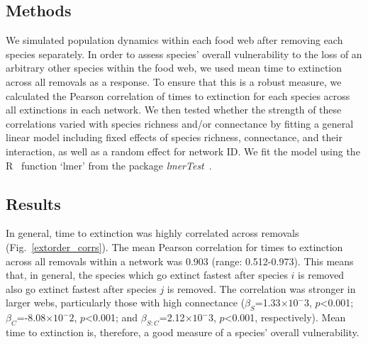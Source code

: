 \documentclass[12pt]{article}
\begin{document}
	\subsection*{Methods}

		We simulated population dynamics within each food web after removing each species separately. 
		In order to assess species' overall vulnerability to the loss of an arbitrary other species within the food web, we used mean time to extinction across all removals as a response. 
		To ensure that this is a robust measure, we calculated the Pearson correlation of times to extinction for each species across all extinctions in each network. 
		We then tested whether the strength of these correlations varied with species richness and/or connectance by fitting a general linear model including fixed effects of species richness, connectance, and their interaction, as well as a random effect for network ID. 
		We fit the model using the R~\citep{R} function `lmer' from the package \emph{lmerTest}~\citep{lmerTest}.


	\subsection*{Results}

		In general, time to extinction was highly correlated across removals (Fig.~\ref{extorder_corrs}). %
		The mean Pearson correlation for times to extinction across all removals within a network was 0.903 (range: 0.512-0.973). %
		This means that, in general, the species which go extinct fastest after species $i$ is removed also go extinct fastest after species $j$ is removed.
		The correlation was stronger in larger webs, particularly those with high connectance ($\beta_{S}$=1.33$\times10^-3$, $p$\textless0.001; $\beta_{C}$=-8.08$\times10^-2$, $p$\textless0.001; and $\beta_{S:C}$=2.12$\times10^-3$, $p$\textless0.001, respectively). 
		Mean time to extinction is, therefore, a good measure of a species' overall vulnerability.
\end{document}
